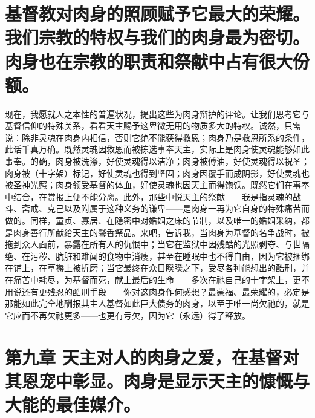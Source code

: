 
\section{基督教对肉身的照顾赋予它最大的荣耀。我们宗教的特权与我们的肉身最为密切。肉身也在宗教的职责和祭献中占有很大份额。}

现在，我愿就人之本性的普遍状况，提出这些为肉身辩护的评论。让我们思考它与基督信仰的特殊关系，看看天主赐予这卑微无用的物质多大的特权。诚然，只需说：除非灵魂在肉身内相信，否则它绝不能获得救恩；肉身乃是救恩所系的条件，此话千真万确。既然灵魂因救恩而被拣选事奉天主，实际上是肉身使灵魂能够如此事奉。的确，肉身被洗涤，好使灵魂得以洁净；肉身被傅油，好使灵魂得以祝圣；肉身被（十字架）标记，好使灵魂也得到坚固；肉身因覆手而成阴影，好使灵魂也被圣神光照；肉身领受基督的体血，好使灵魂也因天主而得饱饫。既然它们在事奉中结合，在赏报上便不能分离。此外，那些中悦天主的祭献——我是指灵魂的战斗、斋戒、克己以及附属于这种义务的谦卑——是肉身一再为它自身的特殊痛苦而做的。同样，童贞、寡居、在隐密中对婚姻之床的节制，以及唯一的婚姻采纳，都是肉身善行所献给天主的馨香祭品。来吧，告诉我，当肉身为基督的名争战时，被拖到众人面前，暴露在所有人的仇恨中；当它在监狱中因残酷的光照剥夺、与世隔绝、在污秽、肮脏和难闻的食物中消瘦，甚至在睡眠中也不得自由，因为它被捆绑在铺上，在草褥上被折磨；当它最终在众目睽睽之下，受尽各种能想出的酷刑，并在痛苦中耗尽，为基督而死，献上最后的生命——多次在祂自己的十字架上，更不用说还有更残忍的酷刑手段——你对这肉身作何感想？最蒙福、最荣耀的，必定是那能如此完全地酬报其主人基督如此巨大债务的肉身，以至于唯一尚欠祂的，就是它应而不再欠祂更多——也更有亏欠，因为它（永远）得了释放。\par


\section{第九章 天主对人的肉身之爱，在基督对其恩宠中彰显。肉身是显示天主的慷慨与大能的最佳媒介。}

